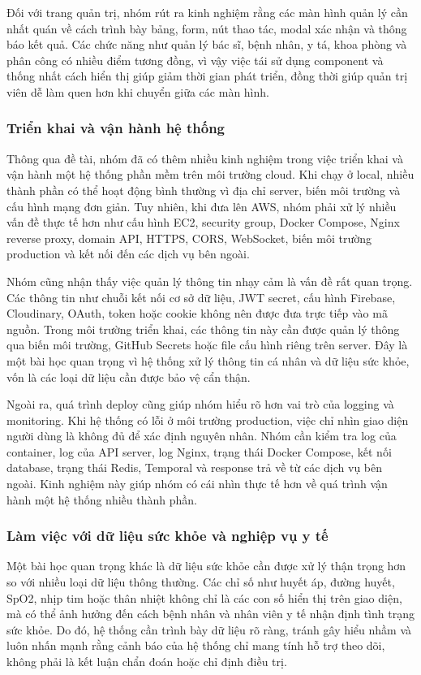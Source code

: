 \par Đối với trang quản trị, nhóm rút ra kinh nghiệm rằng các màn hình quản lý cần nhất quán về cách trình bày bảng, form, nút thao tác, modal xác nhận và thông báo kết quả. Các chức năng như quản lý bác sĩ, bệnh nhân, y tá, khoa phòng và phân công có nhiều điểm tương đồng, vì vậy việc tái sử dụng component và thống nhất cách hiển thị giúp giảm thời gian phát triển, đồng thời giúp quản trị viên dễ làm quen hơn khi chuyển giữa các màn hình.

\subsubsection{Triển khai và vận hành hệ thống}
\par Thông qua đề tài, nhóm đã có thêm nhiều kinh nghiệm trong việc triển khai và vận hành một hệ thống phần mềm trên môi trường cloud. Khi chạy ở local, nhiều thành phần có thể hoạt động bình thường vì địa chỉ server, biến môi trường và cấu hình mạng đơn giản. Tuy nhiên, khi đưa lên AWS, nhóm phải xử lý nhiều vấn đề thực tế hơn như cấu hình EC2, security group, Docker Compose, Nginx reverse proxy, domain API, HTTPS, CORS, WebSocket, biến môi trường production và kết nối đến các dịch vụ bên ngoài.

\par Nhóm cũng nhận thấy việc quản lý thông tin nhạy cảm là vấn đề rất quan trọng. Các thông tin như chuỗi kết nối cơ sở dữ liệu, JWT secret, cấu hình Firebase, Cloudinary, OAuth, token hoặc cookie không nên được đưa trực tiếp vào mã nguồn. Trong môi trường triển khai, các thông tin này cần được quản lý thông qua biến môi trường, GitHub Secrets hoặc file cấu hình riêng trên server. Đây là một bài học quan trọng vì hệ thống xử lý thông tin cá nhân và dữ liệu sức khỏe, vốn là các loại dữ liệu cần được bảo vệ cẩn thận.

\par Ngoài ra, quá trình deploy cũng giúp nhóm hiểu rõ hơn vai trò của logging và monitoring. Khi hệ thống có lỗi ở môi trường production, việc chỉ nhìn giao diện người dùng là không đủ để xác định nguyên nhân. Nhóm cần kiểm tra log của container, log của API server, log Nginx, trạng thái Docker Compose, kết nối database, trạng thái Redis, Temporal và response trả về từ các dịch vụ bên ngoài. Kinh nghiệm này giúp nhóm có cái nhìn thực tế hơn về quá trình vận hành một hệ thống nhiều thành phần.

\subsubsection{Làm việc với dữ liệu sức khỏe và nghiệp vụ y tế}
\par Một bài học quan trọng khác là dữ liệu sức khỏe cần được xử lý thận trọng hơn so với nhiều loại dữ liệu thông thường. Các chỉ số như huyết áp, đường huyết, SpO2, nhịp tim hoặc thân nhiệt không chỉ là các con số hiển thị trên giao diện, mà có thể ảnh hưởng đến cách bệnh nhân và nhân viên y tế nhận định tình trạng sức khỏe. Do đó, hệ thống cần trình bày dữ liệu rõ ràng, tránh gây hiểu nhầm và luôn nhấn mạnh rằng cảnh báo của hệ thống chỉ mang tính hỗ trợ theo dõi, không phải là kết luận chẩn đoán hoặc chỉ định điều trị.

